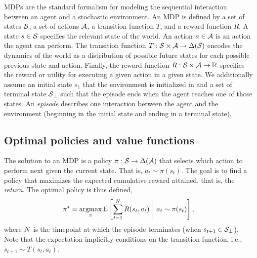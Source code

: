 MDPs are the standard formalism for modeling the sequential interaction between an agent and a stochastic environment. An MDP is defined by a set of states $\S$, a set of actions $\A$, a transition function $T$, and a reward function $R$. A state $s \in \S$ specifies the relevant state of the world. An action $a \in \A$ is an action the agent can perform. The transition function $T: \S \times \A \rightarrow \Delta(\S)$\footnotemark{} encodes the dynamics of the world as a distribution of possible future states for each possible previous state and action. Finally, the reward function $R: \S \times \A \rightarrow \R $ specifies the reward or utility for executing a given action in a given state. We additionally assume an initial state $s_1$ that the environment is initialized in and a set of terminal state $\S_\bot$ such that the episode ends when the agent reaches one of those states. An \emph{episode} describes one interaction between the agent and the environment (beginning in the initial state and ending in a terminal state).



\subsection{Optimal policies and value functions}

The solution to an MDP is a policy $\pi: \S \rightarrow \Delta(\A)$ that selects which action to perform next given the current state. That is, $a_t \sim \pi(s_t)$. The goal is to find a policy that maximizes the expected cumulative reward attained, that is, the \emph{return}. The optimal policy is thus defined,
\begin{equation}\label{eq:optimal-policy}
  \pi^* = \argmax_\pi \expect{
    \sum_{t=1}^{\tmax} R(s_t, a_t)
  }{
   a_t \sim \pi(s_t)
  },
\end{equation}
where $\tmax$ is the timepoint at which the episode terminates (when $s_{t+1} \in \S_\bot$). Note that the expectation implicitly conditions on the transition function, i.e., $s_{t+1} \sim T(s_t, a_t)$.

